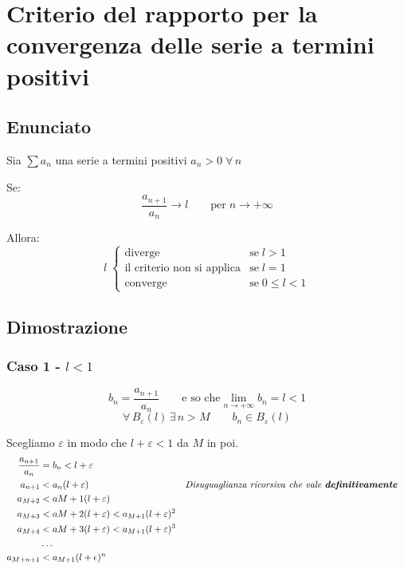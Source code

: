 \documentclass[../dimostrazioni]{subfiles}
\begin{document}
    \chapter{Criterio del rapporto per la convergenza delle serie a termini positivi}
    \label{criterioRapportoSerie}

        \section*{Enunciato}

            Sia \(\sum a_n\) una serie a termini positivi \(a_n > 0 \; \forall \, n\)
            
            Se:
             \[\frac{a_{n+1}}{a_n} \longrightarrow l \qquad  \text{per} \; n \rightarrow +\infty \]
            
            Allora:
            \[
                l \;
                \begin{cases}
                    \text{diverge} & \text{se} \; l > 1\\
                    \text{il criterio non si applica} & \text{se} \; l = 1\\
                    \text{converge} & \text{se} \; 0 \leqslant l < 1
                \end{cases}
            \]
            
        \section*{Dimostrazione}
            
            \subsection*{Caso 1 - \(l < 1\)} 
            
                \[b_n = \frac{a_{n+1}}{a_n} \qquad \text{e so che} \lim_{n \to +\infty}b_n = l < 1 \] 
                \[\forall \, B_\varepsilon (l) \, \exists \, n > M \qquad b_n \in B_\varepsilon (l) \]

                Scegliamo \(\varepsilon\) in modo che \(l + \varepsilon < 1 \) da \(M\) in poi.
                \begin{align*}
                    \frac{a_{n+1}}{a_n} &= b_n < l + \varepsilon \\
                    a_{n+1} &< a_n(l + \varepsilon) && \text{\emph{Disuguaglianza ricorsiva che vale \textbf{definitivamente}}} \\
                    a_{M+2} &< a{M+1} (l + \varepsilon) \\
                    a_{M+3} &< a{M+2} (l + \varepsilon) < a_{M+1}(l + \varepsilon)^{2}\\
                    a_{M+4} &< a{M+3} (l + \varepsilon) < a_{M+1}(l + \varepsilon)^{3} \\
                    &\dots \\
                    a_{M+n+1} &< a_{M+1}(l + \epsilon)^n
                \end{align*}
\end{document}
